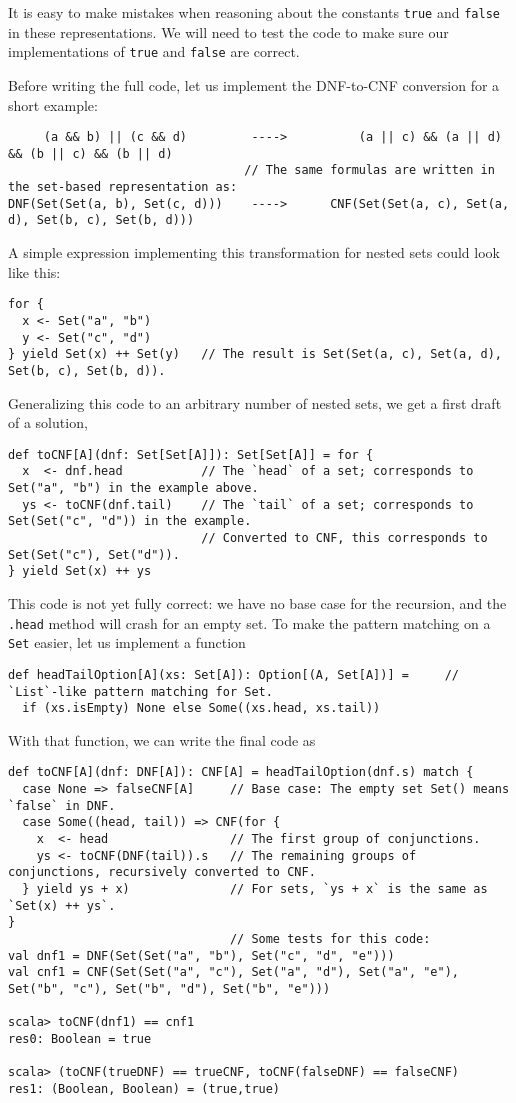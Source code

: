 It is easy to make mistakes when reasoning about the constants \lstinline!true!
and \lstinline!false! in these representations. We will need to test
the code to make sure our implementations of \lstinline!true! and
\lstinline!false! are correct.

Before writing the full code, let us implement the DNF-to-CNF conversion
for a short example: 
\begin{lstlisting}
     (a && b) || (c && d)         ---->          (a || c) && (a || d) && (b || c) && (b || d)
                                 // The same formulas are written in the set-based representation as:
DNF(Set(Set(a, b), Set(c, d)))    ---->      CNF(Set(Set(a, c), Set(a, d), Set(b, c), Set(b, d)))
\end{lstlisting}
A simple expression implementing this transformation for nested sets
could look like this: 
\begin{lstlisting}
for {
  x <- Set("a", "b")
  y <- Set("c", "d")
} yield Set(x) ++ Set(y)   // The result is Set(Set(a, c), Set(a, d), Set(b, c), Set(b, d)).
\end{lstlisting}
Generalizing this code to an arbitrary number of nested sets, we get
a first draft of a solution,
\begin{lstlisting}
def toCNF[A](dnf: Set[Set[A]]): Set[Set[A]] = for {
  x  <- dnf.head           // The `head` of a set; corresponds to Set("a", "b") in the example above.
  ys <- toCNF(dnf.tail)    // The `tail` of a set; corresponds to Set(Set("c", "d")) in the example.
                           // Converted to CNF, this corresponds to Set(Set("c"), Set("d")).
} yield Set(x) ++ ys  
\end{lstlisting}
This code is not yet fully correct: we have no base case for the recursion,
and the \lstinline!.head! method will crash for an empty set. To
make the pattern matching on a \lstinline!Set! easier, let us implement
a function
\begin{lstlisting}
def headTailOption[A](xs: Set[A]): Option[(A, Set[A])] =     // `List`-like pattern matching for Set.
  if (xs.isEmpty) None else Some((xs.head, xs.tail))
\end{lstlisting}
With that function, we can write the final code as
\begin{lstlisting}
def toCNF[A](dnf: DNF[A]): CNF[A] = headTailOption(dnf.s) match {
  case None => falseCNF[A]     // Base case: The empty set Set() means `false` in DNF.
  case Some((head, tail)) => CNF(for {
    x  <- head                 // The first group of conjunctions.
    ys <- toCNF(DNF(tail)).s   // The remaining groups of conjunctions, recursively converted to CNF.
  } yield ys + x)              // For sets, `ys + x` is the same as `Set(x) ++ ys`.
}
                               // Some tests for this code:
val dnf1 = DNF(Set(Set("a", "b"), Set("c", "d", "e")))
val cnf1 = CNF(Set(Set("a", "c"), Set("a", "d"), Set("a", "e"), Set("b", "c"), Set("b", "d"), Set("b", "e")))

scala> toCNF(dnf1) == cnf1
res0: Boolean = true 

scala> (toCNF(trueDNF) == trueCNF, toCNF(falseDNF) == falseCNF)
res1: (Boolean, Boolean) = (true,true)
\end{lstlisting}
